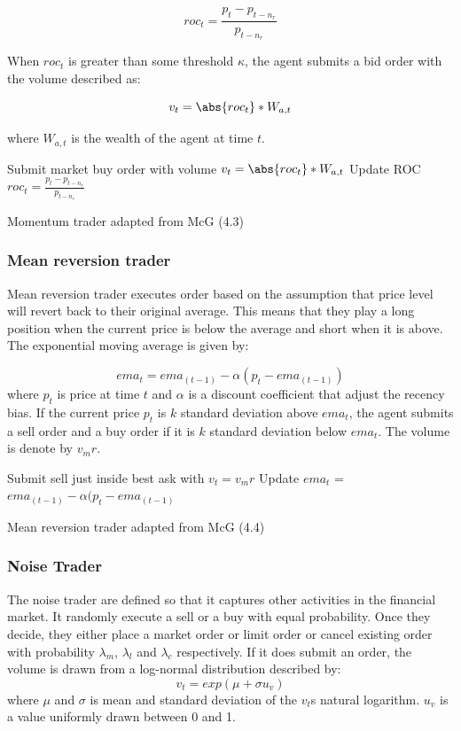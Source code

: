 \documentclass{article}
\begin{document}
    \[ roc_t = \frac{p_t - p_{t-n_r}}{p_{t-n_r}} \]
    
When $roc_t$ is greater than some threshold $\kappa$, the agent submits a bid order with the volume described as:

    \[ v_t = \abs{roc_t} * W_{a,t} \]
    
where $W_{a,t}$ is the wealth of the agent at time $t$. 

\begin{algorithm}[H]
\DontPrintSemicolon 
{} {
     {
    Submit market buy order with volume $v_t = \abs{roc_t} * W_{a,t}$\;
    }
    \EndIf
  }
\EndIf
Update ROC $roc_t = \frac{p_t - p_{t-n_r}}{p_{t-n_r}}$\;  
\caption{{\sc Momentum trader adapted from McG (4.3) \cite{McGroarty} } }
\label{algo:max}
\end{algorithm}


\subsubsection{Mean reversion trader}
Mean reversion trader executes order based on the assumption that price level will revert back to their original average. This means that they play a long position when the current price is below the average and short when it is above. The exponential moving average is given by: 

\[ ema_t = ema_{(t-1)} - \alpha(p_t - ema_{(t-1)}) \] where $p_t$ is price at time $t$ and $\alpha$ is a discount coefficient that adjust the recency bias. If the current price $p_t$ is $k$ standard deviation above $ema_t$, the agent submits a sell order and a buy order if it is $k$ standard deviation below $ema_t$. The volume is denote by $v_mr$.

\begin{algorithm}[H]
\DontPrintSemicolon 
{} {
     {
    Submit sell just inside best ask with $v_t = v_mr$\;
    }
    \EndIf
  }
\EndIf
Update $ema_t$ = $ema_{(t-1)} - \alpha(p_t - ema_{(t-1)}$
\caption{{\sc Mean reversion trader adapted from McG (4.4) \cite{McGroarty}} }
\label{algo:max}
\end{algorithm}


\subsubsection{Noise Trader} 
The noise trader are defined so that it captures other activities in the financial market. It randomly execute a sell or a buy with equal probability. Once they decide, they either place a market order or limit order or cancel existing order with probability $\lambda_{m}$, $\lambda_{l}$ and $\lambda_{c}$ respectively. If it does submit an order, the volume is drawn from a log-normal distribution described by:
\[ v_t = exp(\mu + \sigma u_v) \]
where $\mu$ and $\sigma$ is mean and standard deviation of the $v_t$s natural logarithm. $u_v$ is a value uniformly drawn between 0 and 1. 
\end{document}
